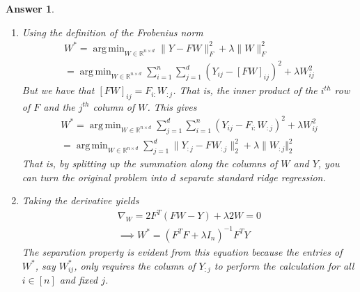 \documentclass[12pt]{article}
\DeclareMathOperator*{\argmin}{arg\,min}
\theoremstyle{colon}
\newtheorem*{answer}{Answer}
\begin{document}
\begin{answer}
  \

  \begin{enumerate}[label=\alph*)]
    \item Using the definition of the Frobenius norm
      \begin{gather*}
        W^* = \argmin_{W \in \mathbb{R}^{n \times d}} \lVert Y - FW \rVert_F^2 + \lambda \lVert W \rVert_F^2 \\
        = \argmin_{W \in \mathbb{R}^{n \times d}} \sum_{i = 1}^n \sum_{j = 1}^d (Y_{ij} - [FW]_{ij})^2 + \lambda W_{ij}^2
      \end{gather*}
      But we have that $[FW]_{ij} = F_{i:} W_{:j}$. That is, the inner product of the $i^{th}$ row of $F$ and the $j^{th}$ column of $W$. This gives
      \begin{gather*}
        W^* = \argmin_{W \in \mathbb{R}^{n \times d}} \sum_{j = 1}^d \sum_{i = 1}^n (Y_{ij} - F_{i:} W_{:j})^2 + \lambda W_{ij}^2 \\
        = \argmin_{W \in \mathbb{R}^{n \times d}} \sum_{j = 1}^d \lVert Y_{:j} - FW_{:j} \rVert_2^2 + \lambda \lVert W_{:j} \Vert_2^2
      \end{gather*}
      That is, by splitting up the summation along the columns of $W$ and $Y$, you can turn the original problem into $d$ separate standard ridge regression.

    \item Taking the derivative yields
      \begin{gather*}
        \nabla_W = 2 F^T (FW - Y) + \lambda 2 W = 0 \\
        \implies W^* = (F^TF + \lambda I_n)^{-1} F^T Y
      \end{gather*}
      The separation property is evident from this equation because the entries of $W^*$, say $W_{ij}^*$, only requires the column of $Y_{:j}$ to perform the calculation for all $i \in [n]$ and fixed $j$.
  \end{enumerate}
\end{answer}

\clearpage
\end{document}
